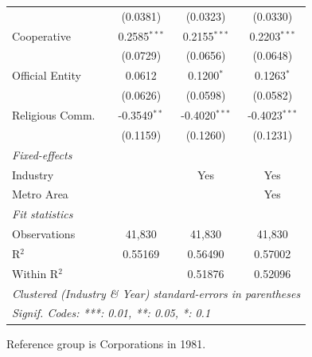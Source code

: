 \documentclass[
  12pt]{article}
\theoremstyle{definition}
\theoremstyle{remark}
\begin{document}
\begin{table}
\begin{minipage}{\linewidth}
\begin{tabular}{lccc}
                     & (0.0381)       & (0.0323)        & (0.0330)\\   
   Cooperative       & 0.2585$^{***}$ & 0.2155$^{***}$  & 0.2203$^{***}$\\   
                     & (0.0729)       & (0.0656)        & (0.0648)\\   
   Official Entity   & 0.0612         & 0.1200$^{*}$    & 0.1263$^{*}$\\   
                     & (0.0626)       & (0.0598)        & (0.0582)\\   
   Religious Comm.   & -0.3549$^{**}$ & -0.4020$^{***}$ & -0.4023$^{***}$\\   
                     & (0.1159)       & (0.1260)        & (0.1231)\\   
   \midrule
   \emph{Fixed-effects}\\
   Industry          &                & Yes             & Yes\\  
   Metro Area        &                &                 & Yes\\  
   \midrule
   \emph{Fit statistics}\\
   Observations      & 41,830         & 41,830          & 41,830\\  
   R$^2$             & 0.55169        & 0.56490         & 0.57002\\  
   Within R$^2$      &                & 0.51876         & 0.52096\\  
   \midrule \midrule
   \multicolumn{4}{l}{\emph{Clustered (Industry \& Year) standard-errors in parentheses}}\\
   \multicolumn{4}{l}{\emph{Signif. Codes: ***: 0.01, **: 0.05, *: 0.1}}\\
\end{tabular}

\end{minipage}%
\newline
\begin{minipage}{\linewidth}

\par \raggedright

\end{minipage}%
\newline
\begin{minipage}{\linewidth}

Reference group is Corporations in 1981.

\end{minipage}%
\newline
\begin{minipage}{\linewidth}

\par\endgroup

\end{minipage}%

\end{table}%
\end{document}
